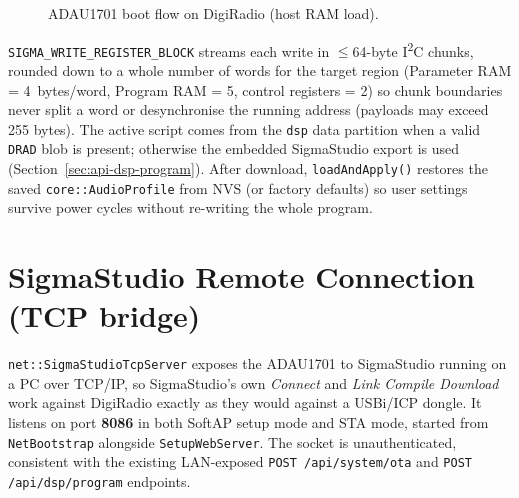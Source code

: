 \begin{figure}[htbp]
  \centering
  \caption{ADAU1701 boot flow on DigiRadio (host RAM load).}
  \label{fig:adau1701-boot}
\end{figure}

\texttt{SIGMA\_WRITE\_REGISTER\_BLOCK} streams each write in $\leq$64-byte
I\textsuperscript{2}C chunks, rounded down to a whole number of words for the
target region (Parameter RAM = 4~bytes/word, Program RAM = 5, control
registers = 2) so chunk boundaries never split a word or desynchronise the
running address (payloads may exceed 255 bytes). The active script comes from the
\texttt{dsp} data partition when a valid \texttt{DRAD} blob is present; otherwise
the embedded SigmaStudio export is used (Section~\ref{sec:api-dsp-program}).
After download, \texttt{loadAndApply()} restores the saved
\texttt{core::AudioProfile} from NVS (or factory defaults) so user settings
survive power cycles without re-writing the whole program.

\section{SigmaStudio Remote Connection (TCP bridge)}
\label{sec:adau1701-sigmastudio-tcp}

\texttt{net::SigmaStudioTcpServer}\label{cls:SigmaStudioTcpServer} exposes the
ADAU1701 to SigmaStudio running on a PC over TCP/IP, so SigmaStudio's own
\emph{Connect} and \emph{Link Compile Download} work against DigiRadio exactly
as they would against a USBi/ICP dongle. It listens on port \textbf{8086} in
both SoftAP setup mode and STA mode, started from \texttt{NetBootstrap}
alongside \texttt{SetupWebServer}. The socket is unauthenticated, consistent
with the existing LAN-exposed \texttt{POST /api/system/ota} and
\texttt{POST /api/dsp/program} endpoints.


